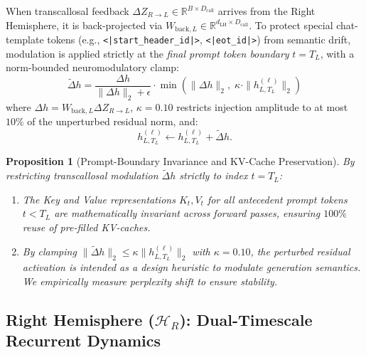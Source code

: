 \documentclass[11pt,a4paper]{article}
\theoremstyle{plain}
\newtheorem{proposition}[theorem]{Proposition}
\theoremstyle{definition}
\theoremstyle{remark}
\newcommand{\HR}{\mathcal{H}_R}
\begin{document}
When transcallosal feedback $\Delta Z_{R \to L} \in \mathbb{R}^{B \times D_{\mathrm{call}}}$ arrives from the Right Hemisphere, it is back-projected via $W_{\mathrm{back}, L} \in \mathbb{R}^{d_{\mathrm{LH}} \times D_{\mathrm{call}}}$. To protect special chat-template tokens (e.g., \texttt{<|start\_header\_id|>}, \texttt{<|eot\_id|>}) from semantic drift, modulation is applied strictly at the \emph{final prompt token boundary} $t = T_L$, with a norm-bounded neuromodulatory clamp:
\begin{equation}
    \tilde{\Delta} h = \frac{\Delta h}{\|\Delta h\|_2 + \epsilon} \cdot \min\left(\|\Delta h\|_2, \; \kappa \cdot \|h_{L, T_L}^{(\ell)}\|_2\right)
\end{equation}
where $\Delta h = W_{\mathrm{back}, L} \Delta Z_{R \to L}$, $\kappa = 0.10$ restricts injection amplitude to at most $10\%$ of the unperturbed residual norm, and:
\begin{equation}
    h_{L, T_L}^{(\ell)} \leftarrow h_{L, T_L}^{(\ell)} + \tilde{\Delta} h.
\end{equation}

\begin{proposition}[Prompt-Boundary Invariance and KV-Cache Preservation]
\label{prop:prompt_invariance}
By restricting transcallosal modulation $\tilde{\Delta} h$ strictly to index $t = T_L$:
\begin{enumerate}
    \item The Key and Value representations $K_t, V_t$ for all antecedent prompt tokens $t < T_L$ are mathematically invariant across forward passes, ensuring $100\%$ reuse of pre-filled KV-caches.
    \item By clamping $\|\tilde{\Delta} h\|_2 \le \kappa \|h_{L, T_L}^{(\ell)}\|_2$ with $\kappa = 0.10$, the perturbed residual activation is intended as a design heuristic to modulate generation semantics. We empirically measure perplexity shift to ensure stability.
\end{enumerate}
\end{proposition}

\subsection{Right Hemisphere ($\HR$): Dual-Timescale Recurrent Dynamics}
\end{document}
